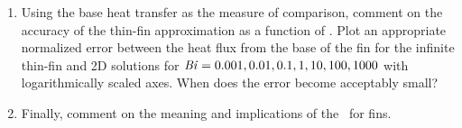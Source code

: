 \documentclass[12pt,letterpaper]{article}
\begin{document}
\begin{enumerate}
\begin{enumerate}
		\item Using the base heat transfer as the measure of comparison, comment on the accuracy of the thin-fin approximation as a function of \Bi.
		Plot an appropriate normalized error between the heat flux from the base of the fin for the infinite thin-fin and 2D solutions for $\mathit{Bi} = 0.001, 0.01, 0.1, 1, 10, 100, 1000$ with logarithmically scaled axes.
		When does the error become acceptably small?
		
		\item Finally, comment on the meaning and implications of the \Bi~for fins.

	\end{enumerate}


\end{enumerate}
\end{document}
